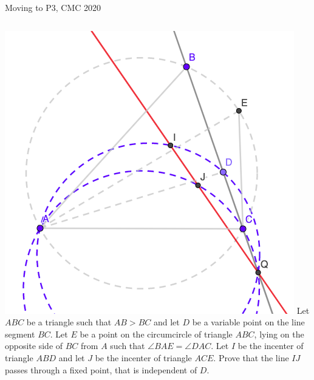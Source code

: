 \documentclass{beamer}
\begin{document}
\begin{frame}{Moving to P3, CMC 2020}
	\begin{columns}
		\includegraphics[scale=0.34]{spi11.png}
		\small{
		Let $ABC$ be a triangle such that $AB>BC$ and let $D$ 
		be a variable point on the line segment $BC$. Let $ E$
		be a point on the circumcircle of triangle $ABC$, lying
		on the opposite side of $BC$ from $A$ such that 
		$\angle BAE = \angle DAC$. Let $I$ be the incenter of 
		triangle $ABD$ and let $J$ be the incenter of triangle $
		ACE$. Prove that the line $IJ$ passes through a fixed
		point, that is independent of $D$.
		}
	\end{columns}
\end{frame}
\end{document}
